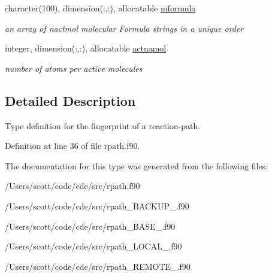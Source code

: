 \begin{DoxyCompactItemize}
character(100), dimension(\+:,\+:), allocatable \mbox{\hyperlink{structrpath_1_1fingerprint_a30fcbb0998685ed985faab7fa832d0c5}{mformula}}
\begin{DoxyCompactList}\small\item\em an array of nactmol molecular Formula strings in a unique order \end{DoxyCompactList}\item 
\mbox{\label{structrpath_1_1fingerprint_a713ef191be6d2b4b42c9e512bdb31a2d}} 
integer, dimension(\+:,\+:), allocatable \mbox{\hyperlink{structrpath_1_1fingerprint_a713ef191be6d2b4b42c9e512bdb31a2d}{actnamol}}
\begin{DoxyCompactList}\small\item\em number of atoms per active molecules \end{DoxyCompactList}\end{DoxyCompactItemize}


\subsection{Detailed Description}
Type definition for the fingerprint of a reaction-\/path. 

Definition at line 36 of file rpath.\+f90.



The documentation for this type was generated from the following files\+:\begin{DoxyCompactItemize}
\item 
/\+Users/scott/code/cde/src/rpath.\+f90\item 
/\+Users/scott/code/cde/src/rpath\+\_\+\+B\+A\+C\+K\+U\+P\+\_.\+f90\item 
/\+Users/scott/code/cde/src/rpath\+\_\+\+B\+A\+S\+E\+\_.\+f90\item 
/\+Users/scott/code/cde/src/rpath\+\_\+\+L\+O\+C\+A\+L\+\_.\+f90\item 
/\+Users/scott/code/cde/src/rpath\+\_\+\+R\+E\+M\+O\+T\+E\+\_.\+f90\end{DoxyCompactItemize}
